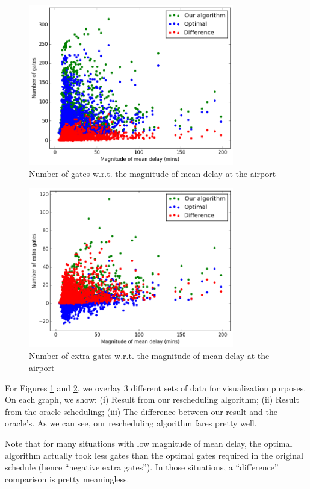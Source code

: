 \documentclass[12pt, a4paper]{report}
\begin{document}
\begin{figure}[h!]
\centering
\includegraphics[width=0.8\textwidth]{../graph/3bi.png}
\caption{Number of gates w.r.t. the magnitude of mean delay at the airport}
\label{fig:3bi}
\end{figure}

\begin{figure}[h!]
\centering
\includegraphics[width=0.8\textwidth]{../graph/3bii.png}
\caption{Number of extra gates w.r.t. the magnitude of mean delay at the airport}
\label{fig:3bii}
\end{figure}

For Figures \ref{fig:3bi} and \ref{fig:3bii}, we overlay 3 different sets of data for visualization purposes. On each graph, we show: (i) Result from our rescheduling algorithm; (ii) Result from the oracle scheduling; (iii) The difference between our result and the oracle's. As we can see, our rescheduling algorithm fares pretty well.

Note that for many situations with low magnitude of mean delay, the optimal algorithm actually took less gates than the optimal gates required in the original schedule (hence ``negative extra gates''). In those situations, a ``difference'' comparison is pretty meaningless.
\end{document}
